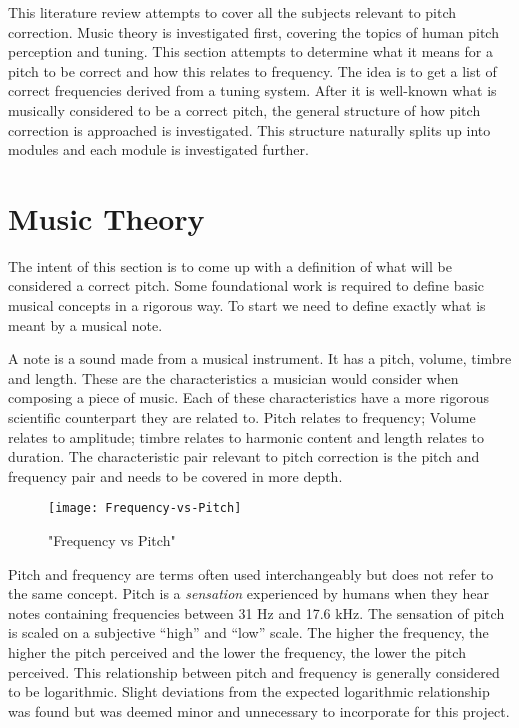 
This literature review attempts to cover all the subjects relevant to pitch
correction. Music theory is investigated first, covering the topics of human pitch
perception and tuning. This section attempts to determine what it means for a
pitch to be correct and how this relates to frequency. The idea is to get a list
of correct frequencies derived from a tuning system. After it is well-known what
is musically considered to be a correct pitch, the general structure of how pitch
correction is approached is investigated. This structure naturally splits up into
modules and each module is investigated further.

\section{Music Theory}

The intent of this section is to come up with a definition of what will be
considered a correct pitch. Some foundational work is required to define basic
musical concepts in a rigorous way. To start we need to define exactly what is
meant by a musical note.

A note is a sound made from a musical instrument. It has a pitch, volume, timbre
and length. These are the characteristics a musician would consider when composing
a piece of music. Each of these characteristics have a more rigorous scientific
counterpart they are related to. Pitch relates to frequency; Volume relates to
amplitude; timbre relates to harmonic content and length relates to duration. The
characteristic pair relevant to pitch correction is the pitch and frequency pair
and needs to be covered in more depth.

\begin{wrapfigure}{L}{0.5\textwidth}
\texttt{[image: Frequency-vs-Pitch]}
\caption{"Frequency vs Pitch"}
\label{fig:FrequencyVsPitch}
\end{wrapfigure}

Pitch and frequency are terms often used interchangeably but does not refer to the
same concept. Pitch is a \textit{sensation} experienced by humans when they hear
notes containing frequencies between 31 Hz and 17.6 kHz\cite{Hearing}. The
sensation of pitch is scaled on a subjective ``high'' and ``low'' scale. The
higher the frequency, the higher the pitch perceived and the lower the frequency,
the lower the pitch perceived. This relationship between pitch and frequency is
generally considered to be logarithmic. Slight deviations from the expected
logarithmic relationship was found\cite{PitchVsFrequency} but was deemed minor
and unnecessary to incorporate for this project.

